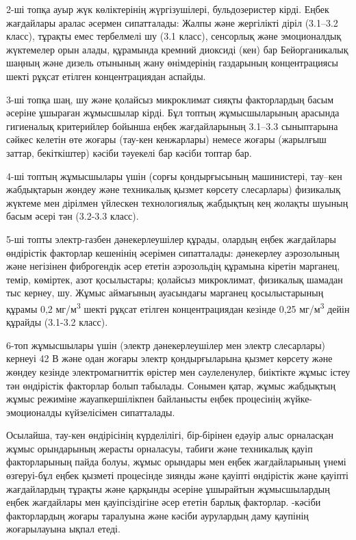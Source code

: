 \begin{multicols}{2}
2-ші топқа ауыр жүк көліктерінің жүргізушілері, бульдозеристер кірді.
Еңбек жағдайлары аралас әсермен сипатталады: Жалпы және жергілікті діріл
(3.1--3.2 класс), тұрақты емес тербелмелі шу (3.1 класс), сенсорлық және
эмоционалдық жүктемелер орын алады, құрамында кремний диоксиді (кен) бар
Бейорганикалық шаңның және дизель отынының жану өнімдерінің газдарының
концентрациясы шекті рұқсат етілген концентрациядан аспайды.

3-ші топқа шаң, шу және қолайсыз микроклимат сияқты факторлардың басым
әсеріне ұшыраған жұмысшылар кірді. Бұл топтың жұмысшыларының арасында
гигиеналық критерийлер бойынша еңбек жағдайларының 3.1--3.3 сыныптарына
сәйкес келетін өте жоғары (тау-кен кенжарлары) немесе жоғары (жарылғыш
заттар, бекіткіштер) кәсіби тәуекелі бар кәсіби топтар бар.

4-ші топтың жұмысшылары үшін (сорғы қондырғысының машинистері, тау--кен
жабдықтарын жөндеу және техникалық қызмет көрсету слесарлары) физикалық
жүктеме мен дірілмен үйлескен технологиялық жабдықтың кең жолақты шуының
басым әсері тән (3.2-3.3 класс).

5-ші топты электр-газбен дәнекерлеушілер құрады, олардың еңбек
жағдайлары өндірістік факторлар кешенінің әсерімен сипатталады:
дәнекерлеу аэрозолының және негізінен фиброгендік әсер ететін
аэрозольдің құрамына кіретін марганец, темір, көміртек, азот
қосылыстары; қолайсыз микроклимат, физикалық шамадан тыс кернеу, шу.
Жұмыс аймағының ауасындағы марганец қосылыстарының құрамы 0,2
мг/м\textsuperscript{3} шекті рұқсат етілген концентрациядан кезінде
0,25 мг/м\textsuperscript{3} дейін құрайды (3.1-3.2 класс).

6-топ жұмысшылары үшін (электр дәнекерлеушілер мен электр слесарлары)
кернеуі 42 В және одан жоғары электр қондырғыларына қызмет көрсету және
жөндеу кезінде электромагниттік өрістер мен сәулеленулер, биіктікте
жұмыс істеу тән өндірістік факторлар болып табылады. Сонымен қатар,
жұмыс жабдықтың жұмыс режиміне жауапкершілікпен байланысты еңбек
процесінің жүйке-эмоционалды күйзелісімен сипатталады.

Осылайша, тау-кен өндірісінің күрделілігі, бір-бірінен едәуір алыс
орналасқан жұмыс орындарының жерасты орналасуы, табиғи және техникалық
қауіп факторларының пайда болуы, жұмыс орындары мен еңбек жағдайларының
үнемі өзгеруі-бұл еңбек қызметі процесінде зиянды және қауіпті
өндірістік және қауіпті жағдайлардың тұрақты және қарқынды әсеріне
ұшырайтын жұмысшылардың еңбек жағдайлары мен қауіпсіздігіне әсер ететін
барлық факторлар. -кәсіби факторлардың жоғары таралуына және кәсіби
аурулардың даму қаупінің жоғарылауына ықпал етеді.


\end{multicols}
